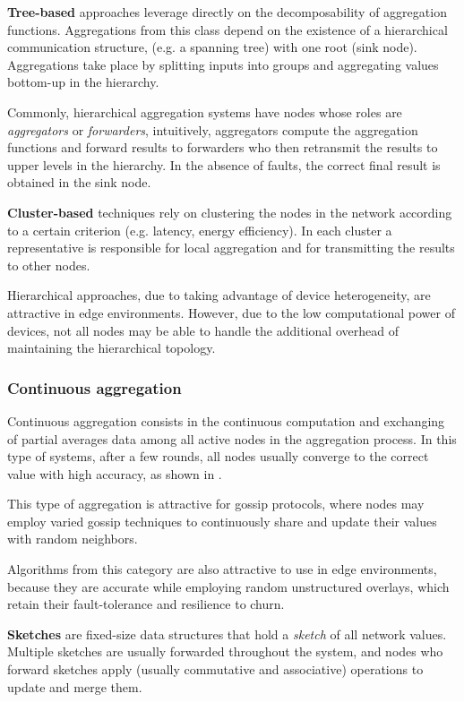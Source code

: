 \textbf{Tree-based} approaches leverage directly on the decomposability of aggregation functions. Aggregations from this class depend on the existence of a hierarchical communication structure, (e.g. a spanning tree) with one root (sink node). Aggregations take place by splitting inputs into groups and aggregating values bottom-up in the hierarchy. 

Commonly, hierarchical aggregation systems have nodes whose roles are \textit{aggregators} or \textit{forwarders}, intuitively, aggregators compute the aggregation functions and forward results to forwarders who then retransmit the results to upper levels in the hierarchy. In the absence of faults, the correct final result is obtained in the sink node.

\textbf{Cluster-based} techniques rely on clustering the nodes in the network according to a certain criterion (e.g. latency, energy efficiency). In each cluster a representative is responsible for local aggregation and for transmitting the results to other nodes. 

Hierarchical approaches, due to taking advantage of device heterogeneity, are attractive in edge environments. However, due to the low computational power of devices, not all nodes may be able to handle the additional overhead of maintaining the hierarchical topology.

\subsubsection{Continuous aggregation}

Continuous aggregation consists in the continuous computation and exchanging of partial averages data among all active nodes in the aggregation process. In this type of systems, after a few rounds, all nodes usually converge to the correct value with high accuracy, as shown in \cite{gossip_aggregation}.

This type of aggregation is attractive for gossip protocols, where nodes may employ varied gossip techniques to continuously share and update their values with random neighbors.

Algorithms from this category are also attractive to use in edge environments, because they are accurate while employing random unstructured overlays, which retain their fault-tolerance and resilience to churn.

\textbf{Sketches} are fixed-size data structures that hold a \textit{sketch} of all network values. Multiple sketches are usually forwarded throughout the system, and nodes who forward sketches apply (usually commutative and associative) operations to update and merge them.


